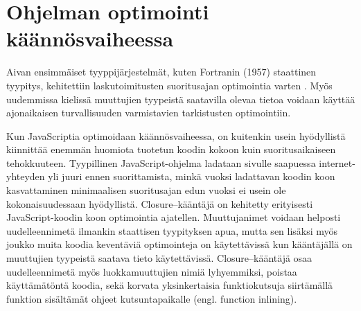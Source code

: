 \section{Ohjelman optimointi käännösvaiheessa}
Aivan ensimmäiset tyyppijärjestelmät, kuten Fortranin (1957) staattinen tyypitys,
kehitettiin laskutoimitusten suoritusajan optimointia varten \cite{TypesAndProgrammingLanguages}.
Myös uudemmissa kielissä muuttujien tyypeistä saatavilla olevaa tietoa
voidaan käyttää ajonaikaisen turvallisuuden varmistavien tarkistusten
optimointiin.

Kun JavaScriptia optimoidaan käännösvaiheessa, on kuitenkin usein hyödyllistä
kiinnittää enemmän huomiota tuotetun koodin kokoon kuin suoritusaikaiseen
tehokkuuteen. Tyypillinen JavaScript-ohjelma ladataan sivulle saapuessa
internet-yhteyden yli juuri ennen suorittamista, minkä vuoksi ladattavan
koodin koon kasvattaminen minimaalisen suoritusajan edun vuoksi ei usein ole
kokonaisuudessaan hyödyllistä. Closure–kääntäjä on kehitetty erityisesti
JavaScript-koodin koon optimointia ajatellen. Muuttujanimet voidaan helposti
uudelleennimetä ilmankin staattisen tyypityksen apua, mutta sen lisäksi myös
joukko muita koodia keventäviä optimointeja on käytettävissä kun kääntäjällä
on muuttujien tyypeistä saatava tieto käytettävissä. Closure–kääntäjä osaa
uudelleennimetä myös luokkamuuttujien nimiä lyhyemmiksi, poistaa
käyttämätöntä koodia, sekä korvata yksinkertaisia funktiokutsuja siirtämällä
funktion sisältämät ohjeet kutsuntapaikalle (engl. function inlining).

